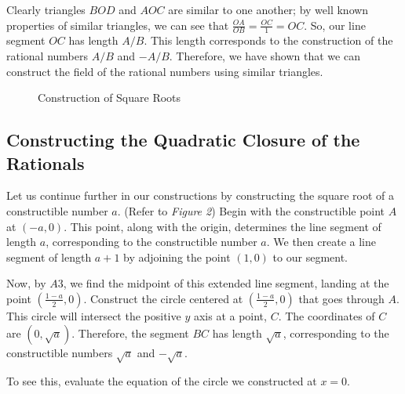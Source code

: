 \documentclass[]{article}
\begin{document}
 Clearly triangles $BOD$ and $AOC$ are similar to one another; by well known properties of similar triangles, we can see that $\frac{OA}{OB}=\frac{OC}{1}=OC$. So, our line segment $OC$ has length $A/B$. This length corresponds to the construction of the rational numbers $A/B$ and $-A/B$. Therefore, we have shown that we can construct the field of the rational numbers using similar triangles.
  
  \begin{figure}[h]
  	\centering
  	\caption{Construction of Square Roots} \label{figure 2}
  \end{figure}
  
 \subsection{Constructing the Quadratic Closure of the Rationals}
 Let us continue further in our constructions by constructing the square root of a constructible number $a$. (Refer to {\em Figure 2}) Begin with the constructible point $A$ at $(-a,0)$. This point, along with the origin, determines the line segment of length $a$, corresponding to the constructible number $a$. We then create a line segment of length $a+1$ by adjoining the point $(1,0)$ to our segment.
   
 Now, by $A3$, we find the midpoint of this extended line segment, landing at the point $(\frac{1-a}{2},0)$. Construct the circle centered at $(\frac{1-a}{2},0)$ that goes through $A$. This circle will intersect the positive $y$ axis at a point, $C$. The coordinates of $C$ are $(0,\sqrt a)$. Therefore, the segment $BC$ has length $\sqrt a$, corresponding to the constructible numbers $\sqrt{a}$ and $-\sqrt{a}$.

 To see this, evaluate the equation of the circle we constructed at $x=0$.
  
\end{document}
